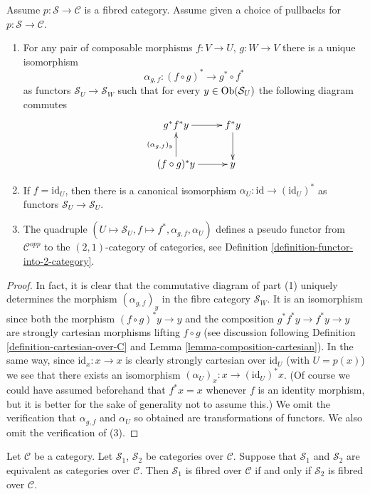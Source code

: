 \begin{lemma}
\label{lemma-fibred}
Assume $p : \mathcal{S} \to \mathcal{C}$ is a fibred category.
Assume given a choice of pullbacks for $p : \mathcal{S} \to \mathcal{C}$.
\begin{enumerate}
\item For any pair of composable morphisms $f : V \to U$,
$g : W \to V$ there is a unique isomorphism
$$
\alpha_{g, f} :
(f \circ g)^\ast
\longrightarrow
g^\ast \circ f^\ast
$$
as functors $\mathcal{S}_U \to \mathcal{S}_W$
such that for every $y\in \mathop{\mathrm{Ob}}\nolimits(\mathcal{S}_U)$ the following
diagram commutes
$$
\xymatrix{
g^\ast f^\ast y \ar[r]
&
f^\ast y \ar[d] \\
(f \circ g)^\ast y \ar[r]
\ar[u]^{(\alpha_{g, f})_y}
&
y
}
$$
\item If $f = \text{id}_U$, then there is a canonical isomorphism
$\alpha_U : \text{id} \to (\text{id}_U)^*$ as functors
$\mathcal{S}_U \to \mathcal{S}_U$.
\item The quadruple
$(U \mapsto \mathcal{S}_U, f \mapsto f^*, \alpha_{g, f}, \alpha_U)$
defines a pseudo functor from $\mathcal{C}^{opp}$ to
the $(2, 1)$-category of categories, see
Definition \ref{definition-functor-into-2-category}.
\end{enumerate}
\end{lemma}

\begin{proof}
In fact, it is clear that the commutative diagram of
part (1) uniquely determines the morphism
$(\alpha_{g, f})_y$ in the fibre category
$\mathcal{S}_W$. It is an isomorphism since both
the morphism $(f \circ g)^*y \to y$
and the composition $g^*f^*y \to f^*y \to y$ are strongly
cartesian morphisms lifting $f \circ g$ (see discussion
following Definition \ref{definition-cartesian-over-C} and
Lemma \ref{lemma-composition-cartesian}). In the same way,
since $\text{id}_x : x \to x$ is clearly strongly cartesian
over $\text{id}_U$ (with $U = p(x)$) we see that there exists
an isomorphism $(\alpha_U)_x : x \to (\text{id}_U)^*x$.
(Of course we could have assumed beforehand that $f^*x = x$
whenever $f$ is an identity morphism, but it is better for
the sake of generality not to assume this.)
We omit the verification that $\alpha_{g, f}$ and
$\alpha_U$ so obtained are transformations of functors.
We also omit the verification of (3).
\end{proof}

\begin{lemma}
\label{lemma-fibred-equivalent}
Let $\mathcal{C}$ be a category.
Let $\mathcal{S}_1$, $\mathcal{S}_2$ be categories over $\mathcal{C}$.
Suppose that $\mathcal{S}_1$ and $\mathcal{S}_2$ are equivalent
as categories over $\mathcal{C}$.
Then $\mathcal{S}_1$ is fibred over $\mathcal{C}$ if and only if
$\mathcal{S}_2$ is fibred over $\mathcal{C}$.
\end{lemma}


